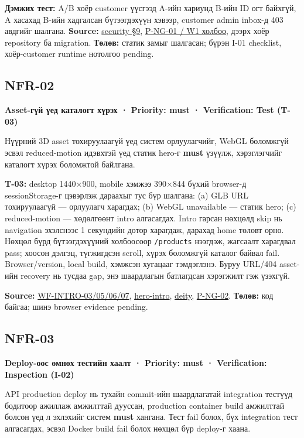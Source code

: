 \documentclass[
  11pt,
  a4paper,
]{article}
\begin{document}
\textbf{Дэмжих тест:} A/B хоёр customer үүсгээд A-ийн хариунд B-ийн ID
огт байхгүй, A хасахад B-ийн хадгалсан бүтээгдэхүүн хэвээр, customer
admin inbox-д 403 авдгийг шалгана. \textbf{Source:}
\href{../../phase-0/08-security.md\#9-idor-prevention}{security §9},
\href{wiki/persona-and-pivot.md}{P-NG-01 / W1 холбоо}, дээрх хоёр
repository ба migration. \textbf{Төлөв:} статик замыг шалгасан; бүрэн
I-01 checklist, хоёр-customer runtime нотолгоо pending.

\clearpage
\subsection{NFR-02}\label{doc4-nfr-02}

\textbf{Asset-гүй үед каталогт хүрэх · Priority: must · Verification:
Test (T-03)}

Нүүрний 3D asset тохируулаагүй үед систем орлуулагчийг, WebGL боломжгүй
эсвэл reduced-motion идэвхтэй үед статик hero-г \textbf{must} үзүүлж,
хэрэглэгчийг каталогт хүрэх боломжтой байлгана.

\textbf{T-03:} desktop 1440×900, mobile хэмжээ 390×844 бүхий browser-д
sessionStorage-г цэвэрлэж дараахыг тус бүр шалгана: (a) GLB URL
тохируулаагүй --- орлуулагч харагдах; (b) WebGL unavailable --- статик
hero; (c) reduced-motion --- хөдөлгөөнт intro алгасагдах. Intro гарсан
нөхцөлд skip нь navigation эхэлснээс 1 секундийн дотор харагдаж, дарахад
home төлөвт орно. Нөхцөл бүрд бүтээгдэхүүний холбоосоор
\nolinkurl{/products} нээгдэж, жагсаалт харагдвал pass; хоосон дэлгэц,
түгжигдсэн scroll, хүрэх боломжгүй каталог байвал fail. Browser/version,
local build, хэмжсэн хугацааг тэмдэглэнэ. Буруу URL/404 asset-ийн
recovery нь тусдаа gap, энэ шаардлагын батлагдсан хэрэгжилт гэж үзэхгүй.

\textbf{Source:}
\href{../../phase-0/07-uiux-wireframes.md}{WF-INTRO-03/05/06/07},
\href{../../../apps/web/src/components/intro/hero-intro.tsx}{hero-intro},
\href{../../../apps/web/src/components/intro/deity.tsx}{deity},
\href{wiki/persona-and-pivot.md}{P-NG-02}. \textbf{Төлөв:} код байгаа;
шинэ browser evidence pending.

\subsection{NFR-03}\label{doc4-nfr-03}

\textbf{Deploy-оос өмнөх тестийн хаалт · Priority: must · Verification:
Inspection (I-02)}

API production deploy нь тухайн commit-ийн шаардлагатай integration
тестүүд бодитоор ажиллаж амжилттай дууссан, production container build
амжилттай болсон үед л эхлэхийг систем \textbf{must} хангана. Тест fail
болох, бүх integration тест алгасагдах, эсвэл Docker build fail болох
нөхцөл бүр deploy-г хаана.
\end{document}
